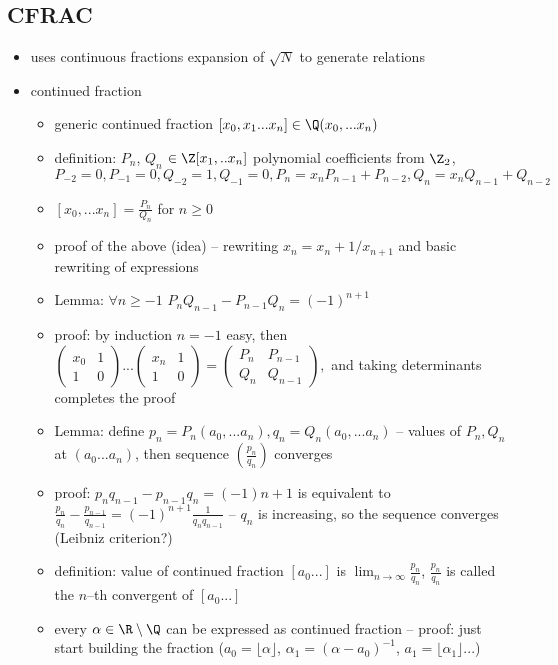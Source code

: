 \subsection*{CFRAC}
\begin{itemize}
	\item uses continuous fractions expansion of $\sqrt{N}$ to generate relations
	
	\item continued fraction
	\begin{itemize}
		\item generic continued fraction $[x_0,x_1...x_n]\in \Q(x_0,...x_n)$
		\item definition: $P_n$, $Q_n$ $\in \Z[x_1,..x_n]$ polynomial coefficients from $\Z_2$, $P_{-2} = 0, P_{-1} = 0, Q_{-2}=1, Q_{-1} = 0, P_n = x_nP_{n-1} + P_{n-2}, Q_n = x_nQ_{n-1} + Q_{n-2}$
		\item $[x_0,...x_n] = \frac{P_n}{Q_n}$ for $n \geq 0$
		\item proof of the above (idea) -- rewriting $x_n = x_n + 1/x_{n+1}$ and basic rewriting of expressions
		\item Lemma: $\forall n \geq -1$ $P_nQ_{n-1}-P_{n-1}Q_n =(-1)^{n+1}$
		\item proof: by induction $n = -1$ easy, then $\begin{pmatrix}
		x_0 & 1 \\ 1 & 0
		\end{pmatrix}...\begin{pmatrix}
		x_n & 1 \\ 1 & 0
		\end{pmatrix} = \begin{pmatrix}
		P_n & P_{n-1} \\ Q_n & Q_{n-1}
		\end{pmatrix}
		,$ and taking determinants completes the proof
		\item Lemma: define $p_n = P_n(a_0,...a_n), q_n = Q_n(a_0,...a_n)$ -- values of $P_n, Q_n$ at $(a_0...a_n)$, then sequence $(\frac{p_n}{q_n})$ converges
		\item proof: $p_nq_{n-1}-p_{n-1}q_n=(-1){n+1}$ is equivalent to $\frac{p_n}{q_n}-\frac{p_{n-1}}{q_{n-1}} = (-1)^{n+1}\frac{1}{q_nq_{n-1}}$ -- $q_n$ is increasing, so the sequence converges (Leibniz criterion?)
		\item definition: value of continued fraction $[a_0...]$ is $\lim_{n\rightarrow \infty}\frac{p_n}{q_n}$, $\frac{p_n}{q_n}$ is called the $n$--th convergent of $[a_0...]$
		\item every $\alpha \in \R \setminus \Q$ can be expressed as continued fraction -- proof: just start building the fraction ($a_0 = \lfloor \alpha \rfloor$, $\alpha_1 = (\alpha-a_0)^{-1}$, $a_1 =\lfloor \alpha_1 \rfloor $...)
	\end{itemize}
	

\end{itemize}
